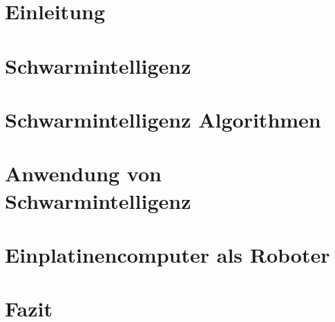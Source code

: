 \documentclass[12pt, a4paper]{report}
\begin{document}


\tableofcontents
\listoffigures
\listoftables
\chapter{Einleitung}

\chapter{Schwarmintelligenz}

\chapter{Schwarmintelligenz Algorithmen}

\chapter{Anwendung von Schwarmintelligenz}

\chapter{Einplatinencomputer als Roboter}

\chapter{Fazit}


\printbibliography
\end{document}
